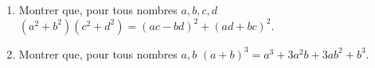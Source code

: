
\begin{enumerate}
\item Montrer que, pour tous nombres $a, b, c, d$ $(a^2+b^2)(c^2+d^2)=(ac-bd)^2+(ad+bc)^2$.
\item Montrer que, pour tous nombres $a, b$ $(a+b)^3=a^3+3a^2b+3ab^2+b^3$.
\end{enumerate}


